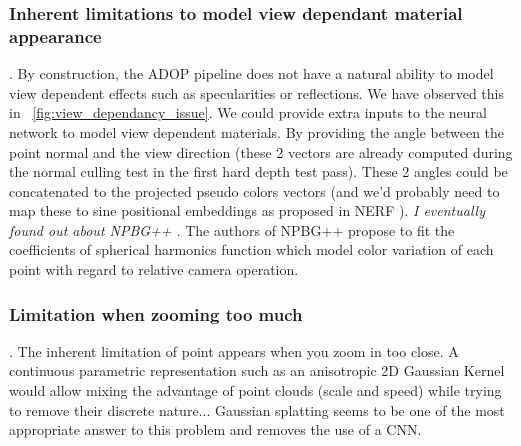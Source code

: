 \subsubsection*{Inherent limitations to model view dependant material appearance}.
By construction, the ADOP pipeline does not have a natural ability to model view dependent effects such as specularities or reflections. We have observed this in ~\cref{fig:view_dependancy_issue}.
We could provide extra inputs to the neural network to model view dependent materials. By providing the angle between the point normal and the view direction (these 2 vectors are already computed during the normal culling test in the first hard depth test pass). These 2 angles could be concatenated to the projected pseudo colors vectors (and we'd probably need to map these to sine positional embeddings as proposed in NERF  \cite{mildenhall2020nerf}). \textit{I eventually found out about NPBG++ \cite{rakhimov2022npbg}}. The authors of NPBG++ propose to fit the coefficients of spherical harmonics function which model color variation of each point with regard to relative camera operation.

\subsubsection*{Limitation when zooming too much}.
The inherent limitation of point appears when you zoom in too close. A continuous parametric representation such as an anisotropic 2D Gaussian Kernel would allow mixing the advantage of point clouds (scale and speed) while trying to remove their discrete nature... Gaussian splatting \cite{kerbl3Dgaussians} seems to be one of the most appropriate answer to this problem  and removes the use of a CNN.